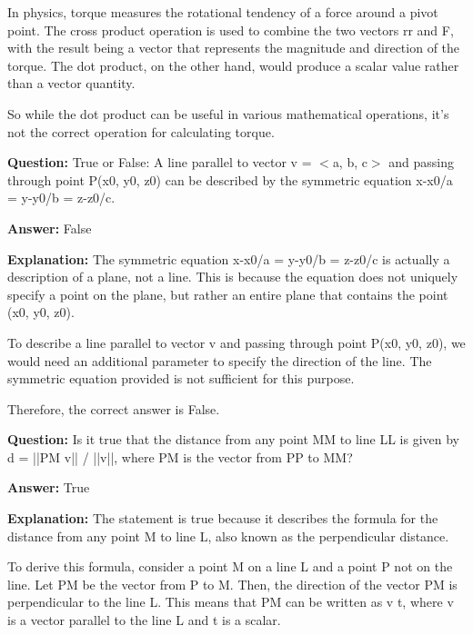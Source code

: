 \documentclass{article}
\begin{document}
In physics, torque measures the rotational tendency of a force around a pivot point. The cross product operation is used to combine the two vectors rr and F, with the result being a vector that represents the magnitude and direction of the torque. The dot product, on the other hand, would produce a scalar value rather than a vector quantity.

So while the dot product can be useful in various mathematical operations, it's not the correct operation for calculating torque.
                
                \vspace{0.5cm} 
        
            
                \textbf {Question:} True or False: A line parallel to vector v = \ensuremath{<}a, b, c\ensuremath{>} and passing through point P(x0, y0, z0) can be described by the symmetric equation x-x0/a = y-y0/b = z-z0/c.
                
                \textbf{Answer:} False

                \textbf{Explanation:} The symmetric equation x-x0/a = y-y0/b = z-z0/c is actually a description of a plane, not a line. This is because the equation does not uniquely specify a point on the plane, but rather an entire plane that contains the point (x0, y0, z0).

To describe a line parallel to vector v and passing through point P(x0, y0, z0), we would need an additional parameter to specify the direction of the line. The symmetric equation provided is not sufficient for this purpose.

Therefore, the correct answer is False.
                
                \vspace{0.5cm} 
        
            
                \textbf {Question:} Is it true that the distance from any point MM to line LL is given by d = ||PM {\texttimes} v|| / ||v||, where PM is the vector from PP to MM?
                
                \textbf{Answer:} True

                \textbf{Explanation:} The statement is true because it describes the formula for the distance from any point M to line L, also known as the perpendicular distance.

To derive this formula, consider a point M on a line L and a point P not on the line. Let PM be the vector from P to M. Then, the direction of the vector PM is perpendicular to the line L. This means that PM can be written as v {\texttimes} t, where v is a vector parallel to the line L and t is a scalar.
\end{document}
